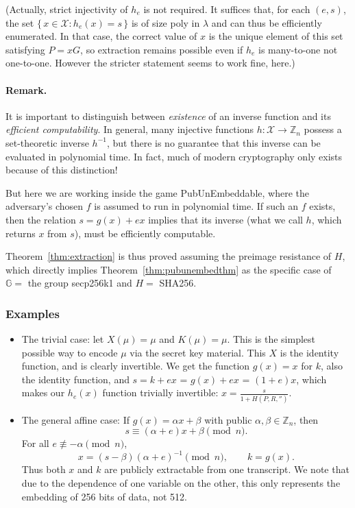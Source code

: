 \documentclass[10pt,a4paper]{article}
\theoremstyle{definition}   %
\theoremstyle{remark}       %
\newcommand{\G}{\mathbb{G}}
\begin{document}
(Actually, strict injectivity of $h_e$ is not required. It suffices that, for each $(e,s)$, the set
$\{\,x \in \mathcal{X} : h_e(x) = s\,\}$ is of size poly in $\lambda$ and can thus be efficiently enumerated. In that case, the correct value of $x$ is the unique element of this set satisfying $P = xG$, so extraction remains possible even if $h_e$ is many-to-one not one-to-one. However the stricter statement seems to work fine, here.)

\vskip 0.2in

\paragraph{Remark.}
It is important to distinguish between \emph{existence} of an inverse
function and its \emph{efficient computability}.
In general, many injective functions $h:\mathcal X \to \mathbb{Z}_n$
possess a set-theoretic inverse $h^{-1}$, but there is no guarantee that
this inverse can be evaluated in polynomial time.
In fact, much of modern cryptography only exists because of this distinction!

But here we are working inside the game PubUnEmbeddable, where
the adversary's chosen $f$ is assumed to run in polynomial time.
If such an $f$ exists, then the relation $s = g(x)+ex$ implies that its inverse (what we call $h$, which returns $x$ from $s$), must be efficiently computable.

\vskip 0.2in

Theorem~\ref{thm:extraction} is thus proved assuming the preimage resistance of $H$, which directly implies Theorem~\ref{thm:pubunembedthm} as the specific case of $\G =$ the group secp256k1 and $H =$ SHA256.


\subsubsection*{Examples}

\begin{itemize}
\item The trivial case: let $X(\mu) = \mu$ and $K(\mu) = \mu$. This is the simplest possible way to encode $\mu$ via the secret key material. This $X$ is the identity function, and is clearly invertible. We get the function $g(x) = x$ for $k$, also the identity function, and $s = k + ex$ = $g(x) + ex$ = $(1+e)x$, which makes our $h_e(x)$ function trivially invertible: $x = \frac{s}{1 + H(P, R, '')}$.
\item The general affine case: If $g(x)=\alpha x+\beta$ with public $\alpha,\beta\in\mathbb{Z}_n$, then
\[
s \equiv (\alpha+e)x + \beta \pmod n.
\]
For all $e\not\equiv -\alpha \pmod n$,
\[
x = (s-\beta)(\alpha+e)^{-1}\pmod n,\qquad k=g(x).
\]
Thus both $x$ and $k$ are publicly extractable from one transcript. We note that due to the dependence of one variable on the other, this only represents the embedding of 256 bits of data, not 512.
\end{itemize}
\end{document}

